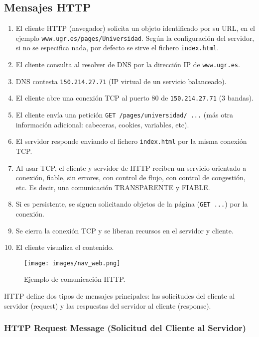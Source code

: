 \documentclass[a4paper,12pt]{article}
\begin{document}
\subsection{Mensajes HTTP}
\begin{enumerate}
    \item El cliente HTTP (navegador) solicita un objeto identificado por su URL, en el ejemplo \texttt{www.ugr.es/pages/Universidad}. Según la configuración del servidor, si no se especifica nada, por defecto se sirve el fichero \texttt{index.html}.
    \item El cliente consulta al resolver de DNS por la dirección IP de \texttt{www.ugr.es}.
    \item DNS contesta \texttt{150.214.27.71} (IP virtual de un servicio balanceado).
    \item El cliente abre una conexión TCP al puerto 80 de \texttt{150.214.27.71} (3 bandas).
    \item El cliente envía una petición \texttt{GET /pages/universidad/ ...} (más otra información adicional: cabeceras, cookies, variables, etc).
    \item El servidor responde enviando el fichero \texttt{index.html} por la misma conexión TCP.
    \item Al usar TCP, el cliente y servidor de HTTP reciben un servicio orientado a conexión, fiable, sin errores, con control de flujo, con control de congestión, etc. Es decir, una comunicación TRANSPARENTE y FIABLE.
    \item Si es persistente, se siguen solicitando objetos de la página (\texttt{GET ...}) por la conexión.
    \item Se cierra la conexión TCP y se liberan recursos en el servidor y cliente.
    \item El cliente visualiza el contenido.
\end{enumerate}

\begin{figure}[H]
    \centering
    \texttt{[image: images/nav\_web.png]}
    \caption{Ejemplo de comunicación HTTP.}
\end{figure}

HTTP define dos tipos de mensajes principales: las solicitudes del cliente al servidor (request) y las respuestas del servidor al cliente (response).

\subsubsection{HTTP Request Message (Solicitud del Cliente al Servidor)}
\end{document}
